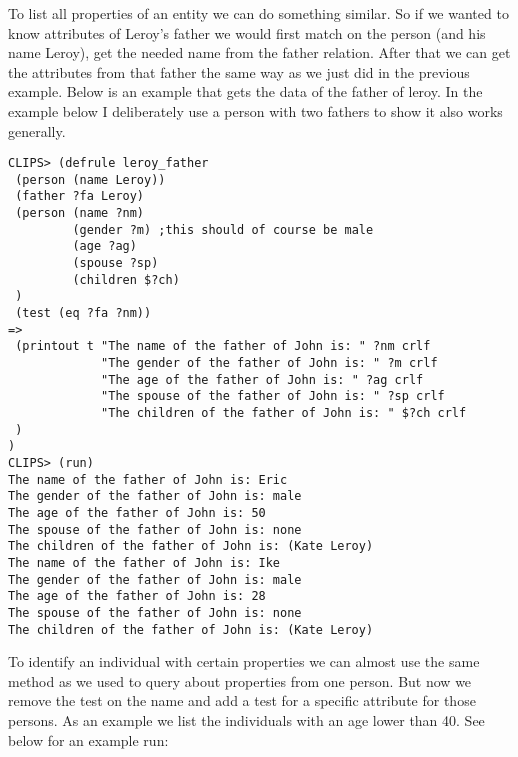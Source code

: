 \documentclass[a4paper]{article}
\begin{document}
To list all properties of an entity we can do something similar. So if we wanted to know attributes of Leroy's father we would first match on the person (and his name Leroy), get the needed name from the father relation. After that we can get the attributes from that father the same way as we just did in the previous example. Below is an example that gets the data of the father of leroy. In the example below I deliberately use a person with two fathers to show it also works generally. 
\begin{Verbatim}[fontsize=\scriptsize]
CLIPS> (defrule leroy_father 
 (person (name Leroy)) 
 (father ?fa Leroy) 
 (person (name ?nm) 
         (gender ?m) ;this should of course be male 
         (age ?ag) 
         (spouse ?sp) 
         (children $?ch) 
 ) 
 (test (eq ?fa ?nm)) 
=>  
 (printout t "The name of the father of John is: " ?nm crlf 
             "The gender of the father of John is: " ?m crlf 
             "The age of the father of John is: " ?ag crlf 
             "The spouse of the father of John is: " ?sp crlf 
             "The children of the father of John is: " $?ch crlf 
 ) 
)
CLIPS> (run)
The name of the father of John is: Eric
The gender of the father of John is: male
The age of the father of John is: 50
The spouse of the father of John is: none
The children of the father of John is: (Kate Leroy)
The name of the father of John is: Ike
The gender of the father of John is: male
The age of the father of John is: 28
The spouse of the father of John is: none
The children of the father of John is: (Kate Leroy)
\end{Verbatim}
To identify an individual with certain properties we can almost use the same method as we used to query about properties from one person. But now we remove the test on the name and add a test for a specific attribute for those persons. As an example we list the individuals with an age lower than 40. See below for an example run:
\end{document}
